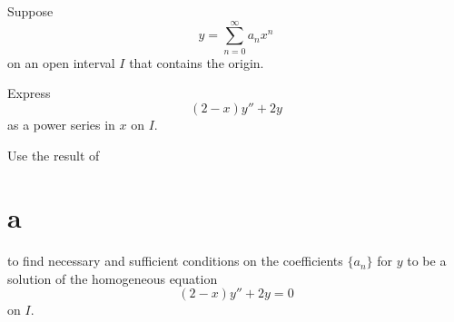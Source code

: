 \setcounter{example}{5}
\setcounter{equation}{12}
\begin{example}
  \label{example:7.1.6} \rm Suppose
  \[
    y=\sum_{n=0}^{\infty}a_{n}x^{n}
  \]
  on an open interval $I$ that contains the origin.
  \begin{alist}
    \item %
    Express
    \[
      (2-x)y''+2y
    \]
    as a power series in $x$ on $I$.

    \item %
    Use the result of \part{a} to find necessary and sufficient conditions on the coefficients
    $\{a_{n}\}$ for $y$ to be a solution of the homogeneous equation
    \begin{equation}
      \label{eq:7.1.13}(2-x)y''+2y=0
    \end{equation}
    on $I$.
  \end{alist}
\end{example}
\setcounter{equation}{13}
